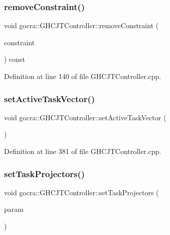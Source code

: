 \subsubsection{\texorpdfstring{remove\+Constraint()}{removeConstraint()}}
{\footnotesize\ttfamily void gocra\+::\+G\+H\+C\+J\+T\+Controller\+::remove\+Constraint (\begin{DoxyParamCaption}\item[{\hyperlink{namespaceocra_ae8b87cf4099be3efc3b410019ad2046e}{ocra\+::\+Linear\+Constraint} \&}]{constraint }\end{DoxyParamCaption}) const}



Definition at line 140 of file G\+H\+C\+J\+T\+Controller.\+cpp.

\hypertarget{classgocra_1_1GHCJTController_aaee75cf0731450ec268d0dbcfb3504c3}{}\label{classgocra_1_1GHCJTController_aaee75cf0731450ec268d0dbcfb3504c3} 
\subsubsection{\texorpdfstring{set\+Active\+Task\+Vector()}{setActiveTaskVector()}}
{\footnotesize\ttfamily void gocra\+::\+G\+H\+C\+J\+T\+Controller\+::set\+Active\+Task\+Vector (\begin{DoxyParamCaption}{ }\end{DoxyParamCaption})}



Definition at line 381 of file G\+H\+C\+J\+T\+Controller.\+cpp.

\hypertarget{classgocra_1_1GHCJTController_a517d7603b3506a09ec7c5ed9b22bd7a9}{}\label{classgocra_1_1GHCJTController_a517d7603b3506a09ec7c5ed9b22bd7a9} 
\subsubsection{\texorpdfstring{set\+Task\+Projectors()}{setTaskProjectors()}}
{\footnotesize\ttfamily void gocra\+::\+G\+H\+C\+J\+T\+Controller\+::set\+Task\+Projectors (\begin{DoxyParamCaption}\item[{Eigen\+::\+Matrix\+Xd \&}]{param }\end{DoxyParamCaption})}



